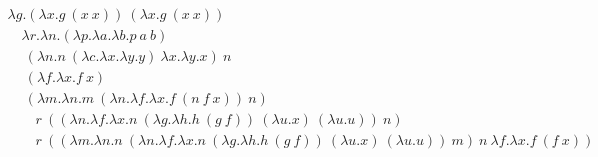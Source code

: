 \documentclass[11pt]{article}
\newcommand{\one}{\lambda f . \lambda x . f \ x}
\newcommand{\two}{\lambda f . \lambda x . f \ (f \ x)}
\newcommand{\tru}{\lambda x . \lambda y . x}
\newcommand{\flse}{\lambda x . \lambda y . y}
\newcommand{\isz}{\lambda n . n \ (\lambda c . \flse) \ \tru}
\newcommand{\ife}{\lambda p . \lambda a . \lambda b . p \ a \ b}
\newcommand{\suc}{\lambda n . \lambda f . \lambda x . f \ (n \ f \ x)}
\newcommand{\plus}{\lambda m . \lambda n . m \ (\suc) \ n}
\newcommand{\pred}{\lambda n . \lambda f . \lambda x . n \ (\lambda g . \lambda h . h \ (g \ f)) \ (\lambda u . x) \ (\lambda u . u)}
\newcommand{\sub}{\lambda m . \lambda n . n \ (\pred) \ m}
\newcommand{\fix}{\lambda g . (\lambda x . g \ (x \ x)) \ (\lambda x . g \ (x \ x))}
\newcommand{\appo}[2]{#1 \ #2}
\newcommand{\appt}[3]{#1 \ #2 \ #3}
\begin{document}
\begin{gather*}
  \fix \\                                   %
  \quad \lambda r . \lambda n . (\ife) \\   %
  \quad \ \appo{(\isz)}{n} \\               %
  \quad \ (\one) \\                         %
  \quad \ (\plus) \\                        %
  \qquad \appo{r}{(\appo{(\pred)}{n})} \\   %
  \qquad \appo{r}{(\appt{(\sub)}{n}{\two})} %
\end{gather*}
\end{document}
